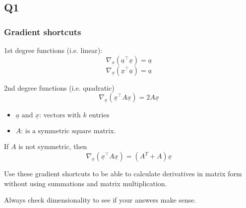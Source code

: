 \subsection{Q1}
\subsubsection{Gradient shortcuts}
\begin{definition}
    1st degree functions (i.e. linear):
    \begin{equation}
        \nabla_{\underline{x}} (\underline{a}^\top \underline{x}) = \underline{a}
    \end{equation}
    \begin{equation}
        \nabla_{\underline{x}} (\underline{x}^\top \underline{a}) = \underline{a} 
    \end{equation}
    
    2nd degree functions (i.e. quadratic)
    \begin{equation}
        \nabla_{\underline{x}} (\underline{x}^\top A \underline{x}) = 2A\underline{x}
    \end{equation}
    \begin{itemize}
        \item $\underline{a} \text{ and } \underline{x} \text{: vectors with } k \text{ entries}$
        \item $A \text{: is a symmetric square matrix}.$
    \end{itemize}
    \vspace{1em}

    If $A$ is not symmetric, then 
    \begin{equation}
        \nabla_{\underline{x}} (\underline{x}^\top A \underline{x}) = (A^T + A)\underline{x}
    \end{equation}
\end{definition}

\begin{intuition}
    Use these gradient shortcuts to be able to calculate derivatives in matrix form without using summations and matrix multiplication. 
\end{intuition}

\begin{warning}
    Always check dimensionality to see if your answers make sense.
\end{warning}

